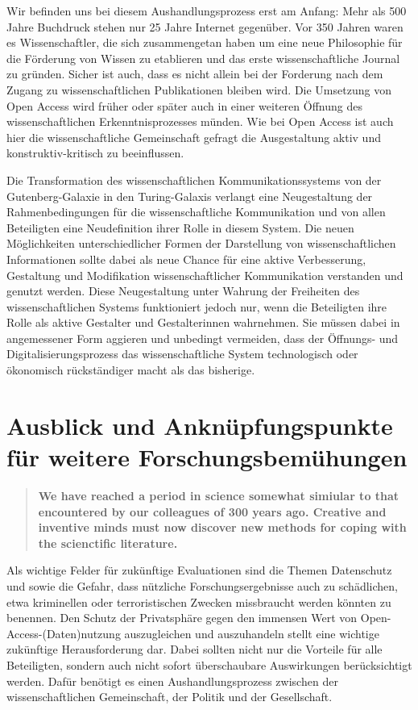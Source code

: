 Wir befinden uns bei diesem Aushandlungsprozess erst am Anfang: Mehr als 500 Jahre Buchdruck stehen nur 25 Jahre Internet gegenüber. Vor 350 Jahren waren es Wissenschaftler, die sich zusammengetan haben um eine neue Philosophie für die Förderung von Wissen zu etablieren und das erste wissenschaftliche Journal zu gründen. Sicher ist auch, dass es nicht allein bei der Forderung nach dem Zugang zu wissenschaftlichen Publikationen bleiben wird. Die Umsetzung von Open Access wird früher oder später auch in einer weiteren Öffnung des wissenschaftlichen Erkenntnisprozesses münden. Wie bei Open Access ist auch hier die wissenschaftliche Gemeinschaft gefragt die Ausgestaltung aktiv und konstruktiv-kritisch zu beeinflussen.

Die Transformation des wissenschaftlichen Kommunikationssystems von der Gutenberg-Galaxie in den Turing-Galaxis verlangt eine Neugestaltung der Rahmenbedingungen für die wissenschaftliche Kommunikation und von allen Beteiligten eine Neudefinition ihrer Rolle in diesem System. Die neuen Möglichkeiten unterschiedlicher Formen der Darstellung von wissenschaftlichen Informationen sollte dabei als neue Chance für eine aktive Verbesserung, Gestaltung und Modifikation wissenschaftlicher Kommunikation verstanden und genutzt werden. Diese Neugestaltung unter Wahrung der Freiheiten des wissenschaftlichen Systems funktioniert jedoch nur, wenn die Beteiligten ihre Rolle als aktive Gestalter und Gestalterinnen wahrnehmen. Sie müssen dabei in angemessener Form aggieren und unbedingt vermeiden, dass der Öffnungs- und Digitalisierungsprozess das wissenschaftliche System technologisch oder ökonomisch rückständiger macht als das bisherige.

\section{Ausblick und Anknüpfungspunkte für weitere Forschungsbemühungen}

\begin{quote}
\textbf{We have reached a period in science somewhat simiular to that encountered by our colleagues of 300 years ago. Creative and inventive minds must now discover new methods for coping with the scienctific literature.}
\end{quote} \cite{porter_1964_scientific}

Als wichtige Felder für zukünftige Evaluationen sind die Themen Datenschutz und sowie die Gefahr, dass nützliche Forschungsergebnisse auch zu schädlichen, etwa kriminellen oder terroristischen Zwecken missbraucht werden könnten \cite{Fritsch_2015} zu benennen. Den Schutz der Privatsphäre gegen den immensen Wert von Open-Access-(Daten)nutzung auszugleichen und auszuhandeln stellt eine wichtige zukünftige Herausforderung dar. Dabei sollten nicht nur die Vorteile für alle Beteiligten, sondern auch nicht sofort überschaubare Auswirkungen berücksichtigt werden. Dafür benötigt es einen Aushandlungsprozess zwischen der wissenschaftlichen Gemeinschaft, der Politik und der Gesellschaft.

